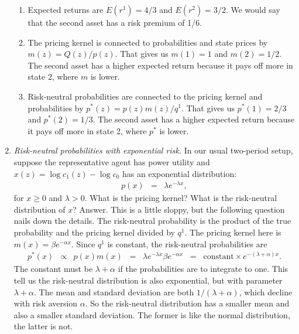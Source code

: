 \documentclass[11pt]{article}
\begin{document}
\begin{enumerate}
\begin{enumerate}
\item Expected returns are
$ E(r^1) = 4/3$ and $E(r^2) = 3/2$.
We would say that the second asset has a risk premium of 1/6.

\item The pricing kernel is connected to probabilities and state
prices by $ m(z) = Q(z)/p(z)$.
That gives us $m(1) = 1$ and $m(2) = 1/2$.
The second asset has a higher expected return because it pays off more in state 2,
where $m$ is lower.

\item Risk-neutral probabilities
are connected to the pricing kernel and probabilities by
$ p^*(z) = p(z) m(z) /q^1 $.
That gives us $p^*(1) = 2/3$ and $p^*(2) = 1/3$.
The second asset has a higher expected return because it pays off more in state 2,
where $p^*$ is lower.

\end{enumerate}

\item {\it Risk-neutral probabilities with exponential risk.\/}
In our usual two-period setup, suppose the representative agent
has power utility and
$x(z) = \log c_1(z) - \log c_0 $ has an exponential distribution:
\begin{eqnarray*}
    p(x) &=& \lambda e^{-\lambda x} ,
\end{eqnarray*}
for $x \geq 0$ and $\lambda > 0$.
What is the pricing kernel?
What is the risk-neutral distribution of $x$?
%
Answer.
This is a little sloppy, but the following question nails down the details.
The risk-neutral probability is
the product of the true probability and the pricing kernel divided by $q^1$.
The pricing kernel here is $  m(x) = \beta e^{-\alpha x} $.
Since $q^1$ is constant, the risk-neutral probabilities are
\begin{eqnarray*}
    p^*(x) &\propto& p(x) m(x)
        \;\;=\;\; \lambda e^{-\lambda x} \beta e^{-\alpha x}
                \;\;=\;\; \mbox{constant} \times e^{-(\lambda + \alpha) x} .
\end{eqnarray*}
The constant must be $\lambda + \alpha$ if the probabilities are
to integrate to one.
This tell us the risk-neutral distribution is also exponential,
but with parameter $\lambda + \alpha$.
The mean and standard deviation are both $1/(\lambda+\alpha)$,
which decline with risk aversion $\alpha$.
So the risk-neutral distribution has a smaller mean
and also a smaller standard deviation.
The former is like the normal distribution, the latter is not.


\end{enumerate}
\end{document}
